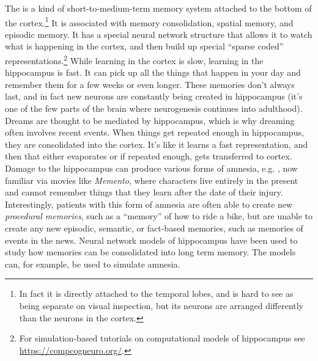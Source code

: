 The  is a kind of short-to-medium-term memory system attached to the bottom of the cortex.\footnote{In fact it is directly attached to the temporal lobes, and is hard to see as being separate on visual inspection, but its neurons are arranged differently than the neurons in the cortex.} It is associated with memory consolidation, spatial memory, and episodic memory. It has a special neural network structure that allows it to watch what is happening in the cortex, and then build up special ``sparse coded'' representations.\footnote{For simulation-based tutorials on computational models of hippocampus see \url{https://compcogneuro.org/}.}  While learning in the cortex is slow, learning in the hippocampus is fast. It can pick up all the things that happen in your day and remember them for a few weeks or even longer. These memories don't always last, and in fact new neurons are constantly being created in hippocampus (it's one of the few parts of the brain where neurogenesis continues into adulthood). Dreams are thought to be mediated by hippocampus, which is why dreaming often involves recent events. When things get repeated enough in hippocampus, they are consolidated into the cortex. It's like it learns a fast representation, and then that either evaporates or if repeated enough, gets transferred to cortex. Damage to the hippocampus can produce various forms of amnesia, e.g. , now familiar via movies like \emph{Memento}, where characters live entirely in the present and cannot remember things that they learn after the date of their injury. Interestingly, patients with this form of amnesia are often able to create new \emph{procedural memories}, such as a ``memory'' of how to ride a bike, but are unable to create any new episodic, semantic, or fact-based memories, such as memories of events in the news. Neural network models of hippocampus have been used to study how memories can be consolidated into long term memory. The models can, for example, be used to simulate amnesia.

